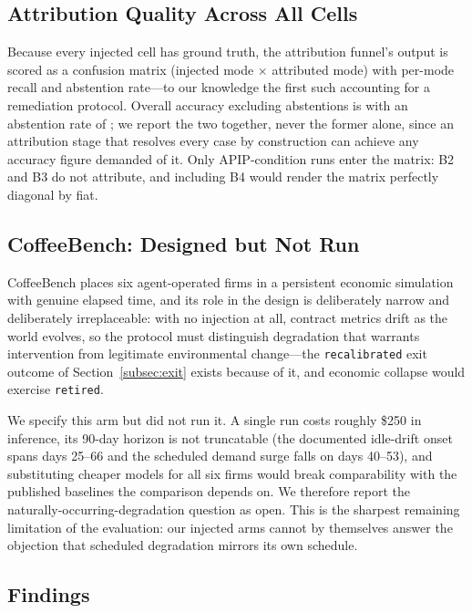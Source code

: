 \subsection{Attribution Quality Across All Cells}
\label{subsec:eval-attribution}

Because every injected cell has ground truth, the attribution funnel's output
is scored as a confusion matrix (injected mode $\times$ attributed mode) with
per-mode recall and abstention rate---to our knowledge the first such
accounting for a remediation protocol. Overall accuracy excluding abstentions
is \attrAccuracy{} with an abstention rate of \attrAbstention{}; we report the
two together, never the former alone, since an attribution stage that resolves
every case by construction can achieve any accuracy figure demanded of it.
Only APIP-condition runs enter the matrix: B2 and B3 do not attribute, and
including B4 would render the matrix perfectly diagonal by fiat.

\subsection{CoffeeBench: Designed but Not Run}
\label{subsec:eval-coffee}

CoffeeBench places six agent-operated firms in a persistent economic simulation
with genuine elapsed time, and its role in the design is deliberately narrow
and deliberately irreplaceable: with no injection at all, contract metrics
drift as the world evolves, so the protocol must distinguish degradation that
warrants intervention from legitimate environmental change---the
\texttt{recalibrated} exit outcome of Section~\ref{subsec:exit} exists
because of it, and economic collapse would exercise \texttt{retired}.

We specify this arm but did not run it. A single run costs roughly \$250 in
inference, its 90-day horizon is not truncatable (the documented idle-drift
onset spans days 25--66 and the scheduled demand surge falls on days 40--53),
and substituting cheaper models for all six firms would break comparability
with the published baselines the comparison depends on. We therefore report
the naturally-occurring-degradation question as open. This is the sharpest
remaining limitation of the evaluation: our injected arms cannot by themselves
answer the objection that scheduled degradation mirrors its own schedule.

\subsection{Findings}
\label{subsec:eval-findings}

